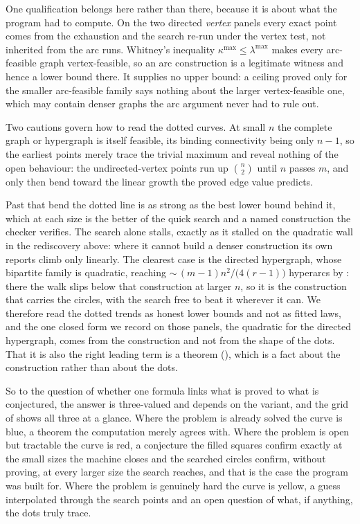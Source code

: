 One qualification belongs here rather than there, because it is about what the program had to compute. On the two directed \emph{vertex} panels every exact point comes from the exhaustion and the search re-run under the vertex test, not inherited from the arc runs. Whitney's inequality $\kappa^{\max} \le \lambda^{\max}$ makes every arc-feasible graph vertex-feasible, so an arc construction is a legitimate witness and hence a lower bound there. It supplies no upper bound: a ceiling proved only for the smaller arc-feasible family says nothing about the larger vertex-feasible one, which may contain denser graphs the arc argument never had to rule out.

Two cautions govern how to read the dotted curves. At small $n$ the complete graph or hypergraph is itself feasible, its binding connectivity being only $n - 1$, so the earliest points merely trace the trivial maximum and reveal nothing of the open behaviour: the undirected-vertex points run up $\binom{n}{2}$ until $n$ passes $m$, and only then bend toward the linear growth the proved edge value predicts.

Past that bend the dotted line is as strong as the best lower bound behind it, which at each size is the better of the quick search and a named construction the checker verifies. The search alone stalls, exactly as it stalled on the quadratic wall in the rediscovery above: where it cannot build a denser construction its own reports climb only linearly. The clearest case is the directed hypergraph, whose bipartite family is quadratic, reaching ${\sim}\,(m-1)n^2/\bigl(4(r-1)\bigr)$ hyperarcs by : there the walk slips below that construction at larger $n$, so it is the construction that carries the circles, with the search free to beat it wherever it can. We therefore read the dotted trends as honest lower bounds and not as fitted laws, and the one closed form we record on those panels, the quadratic for the directed hypergraph, comes from the construction and not from the shape of the dots. That it is also the right leading term is a theorem (), which is a fact about the construction rather than about the dots.

So to the question of whether one formula links what is proved to what is conjectured, the answer is three-valued and depends on the variant, and the grid of  shows all three at a glance. Where the problem is already solved the curve is blue, a theorem the computation merely agrees with. Where the problem is open but tractable the curve is red, a conjecture the filled squares confirm exactly at the small sizes the machine closes and the searched circles confirm, without proving, at every larger size the search reaches, and that is the case the program was built for. Where the problem is genuinely hard the curve is yellow, a guess interpolated through the search points and an open question of what, if anything, the dots truly trace.

